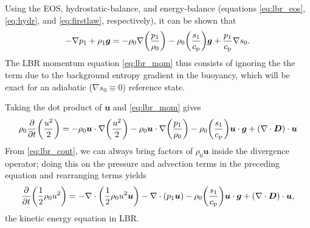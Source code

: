 \documentclass[12pt]{article} %
\newcommand{\cp}{c_{\rm{p}}}
\begin{document}
	Using the EOS, hydrostatic-balance, and energy-balance (equations \eqref{eq:lbr_eos}, \eqref{eq:hydr}, and \eqref{eq:firstlaw}, respectively), it can be shown that 
	\begin{align}
  -\nabla p_1 + \rho_1\bm{g} =  -\rho_0\nabla\bigg{(}\frac{p_1}{\rho_0}\bigg{)} - \rho_0\bigg{(}\frac{s_1}{\cp}\bigg{)}\bm{g} + \frac{p_1}{\cp}\nabla s_0.
	\end{align}
	The LBR momentum equation \eqref{eq:lbr_mom} thus consists of ignoring the the term due to the background entropy gradient in the buoyancy, which will be exact for an adiabatic ($\nabla s_0 \equiv 0$) reference state.
	
	Taking the dot product of $\bm{u}$ and \eqref{eq:lbr_mom} gives
	\begin{align*}
	\rho_0\frac{\partial}{\partial t} \bigg{(}\frac{u^2}{2}\bigg{)} = -\rho_0\bm{u}\cdot\nabla\bigg{(}\frac{u^2}{2}\bigg{)} -\rho_0\bm{u}\cdot\nabla\bigg{(}\frac{p_1}{\rho_0}\bigg{)} - \rho_0 \bigg{(}\frac{s_1}{{\cp}}\bigg{)} \bm{u}\cdot\bm{g} + (\nabla\cdot\bm{D})\cdot\bm{u} 
	\end{align*}
	From \eqref{eq:lbr_cont}, we can always bring factors of $\rho_0\bm{u}$ inside the divergence operator; doing this on the pressure and advection terms in the preceding equation and rearranging terms yields 
		\begin{align}
	\frac{\partial}{\partial t} \bigg{(}\frac{1}{2}\rho_0 u^2\bigg{)}= -\nabla\cdot\bigg{(}\frac{1}{2}\rho_0 u^2\bm{u}\bigg{)} - \nabla\cdot{(p_1\bm{u})} - \rho_0 \bigg{(}\frac{s_1}{{\cp}}\bigg{)} \bm{u}\cdot\bm{g}  + (\nabla\cdot\bm{D})\cdot\bm{u},
	\label{eq:lbr_kin}
	\end{align}
	the kinetic energy equation in LBR. 
	
\end{document}
